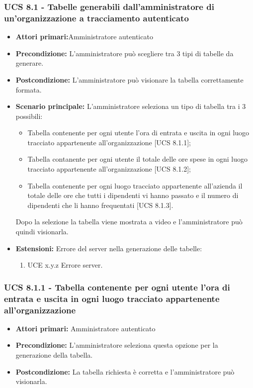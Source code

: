 \subsubsection{UCS 8.1 - Tabelle generabili dall'amministratore di un'organizzazione a tracciamento autenticato}%
\begin{itemize}
\item \textbf{Attori primari:}Amministratore autenticato
\item \textbf{Precondizione:} L'amministratore può scegliere tra 3 tipi di tabelle da generare.
\item \textbf{Postcondizione:} L'amministratore può visionare la tabella correttamente formata.
\item \textbf{Scenario principale:} L'amministratore seleziona un tipo di tabella tra i 3 possibili:
	\begin{itemize}%
	\item Tabella contenente per ogni utente l'ora di entrata e uscita in ogni luogo tracciato appartenente all'organizzazione [UCS 8.1.1];
	\item Tabella contanente per ogni utente il totale delle ore spese in ogni luogo tracciato appartenente all'organizzazione [UCS 8.1.2];
	\item Tabella contenente per ogni luogo tracciato appartenente all'azienda il totale delle ore che tutti i dipendenti vi hanno passato e il numero di dipendenti che li hanno frequentati [UCS 8.1.3].
\end{itemize}
Dopo la selezione la tabella viene mostrata a video e l'amministratore può quindi visionarla.
\item \textbf{Estensioni:} Errore del server nella generazione delle tabelle:
	\begin{enumerate}
		\item UCE x.y.z Errore server.
	\end{enumerate}
\end{itemize}

\subsubsection{UCS 8.1.1 - Tabella contenente per ogni utente l'ora di entrata e uscita in ogni luogo tracciato appartenente all'organizzazione}%
\begin{itemize}
\item \textbf{Attori primari:} Amministratore autenticato
\item \textbf{Precondizione:} L'amministratore seleziona questa opzione per la generazione della tabella.
\item \textbf{Postcondizione:} La tabella richiesta è corretta e l'amministratore può visionarla.
\end{itemize}

